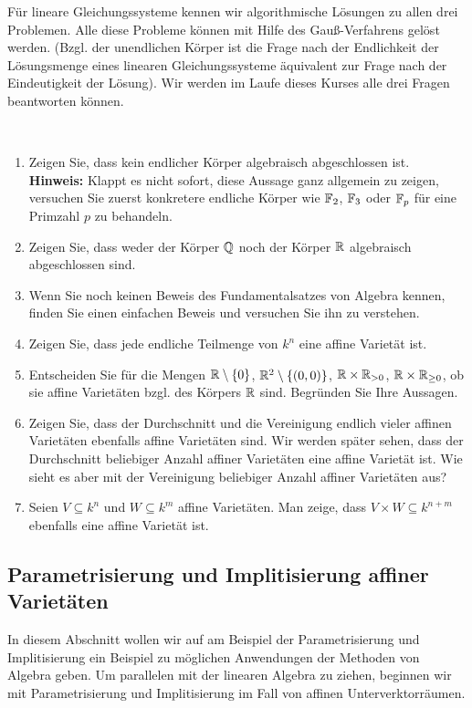\documentclass[11pt]{article}
\numberwithin{equation}{section}
\begin{document}
Für lineare Gleichungssysteme kennen wir algorithmische Lösungen zu allen drei Problemen. Alle diese Probleme können mit Hilfe des Gauß-Verfahrens gelöst werden. (Bzgl. der unendlichen Körper ist die Frage nach der Endlichkeit der Lösungsmenge eines linearen Gleichungssysteme äquivalent zur Frage nach der Eindeutigkeit der Lösung). Wir werden im Laufe dieses Kurses alle drei Fragen beantworten können. 

\begin{aufgaben}{\ }
\begin{enumerate}
	\item Zeigen Sie, dass kein endlicher Körper algebraisch abgeschlossen ist. \textbf{Hinweis:} Klappt es nicht sofort, diese Aussage ganz allgemein zu zeigen, versuchen Sie zuerst konkretere endliche Körper wie $\mathbb{F}_2$, $\mathbb{F}_3$ oder $\mathbb{F}_p$ für eine Primzahl $p$ zu behandeln. 
	\item Zeigen Sie, dass weder der Körper $\mathbb{Q}$ noch der Körper $\mathbb{R}$ algebraisch abgeschlossen sind. 
	\item Wenn Sie noch keinen Beweis des Fundamentalsatzes von Algebra kennen, finden Sie einen einfachen Beweis und versuchen Sie ihn zu verstehen. 
	\item Zeigen Sie, dass jede endliche Teilmenge von $k^n$ eine affine Varietät ist. 
	\item Entscheiden Sie für die Mengen $ \mathbb{R} \setminus \{0\} $, $\mathbb{R}^2 \setminus \{(0,0)\}$, $\mathbb{R} \times \mathbb{R}_{>0}$, $\mathbb{R} \times \mathbb{R}_{\ge 0}$, ob sie affine Varietäten bzgl. des Körpers $\mathbb{R}$ sind. Begründen Sie Ihre Aussagen. 
	\item Zeigen Sie, dass der Durchschnitt und die Vereinigung endlich vieler affinen Varietäten ebenfalls affine Varietäten sind. Wir werden später sehen, dass der Durchschnitt beliebiger Anzahl affiner Varietäten eine affine Varietät ist. Wie sieht es aber mit der Vereinigung beliebiger Anzahl affiner Varietäten aus? 
	\item Seien $V \subseteq k^n$ und $W \subseteq k^m$ affine Varietäten. Man zeige, dass $V \times W \subseteq k^{n +m}$ ebenfalls eine affine Varietät ist. 
\end{enumerate}
\end{aufgaben} 

\subsection{Parametrisierung und Implitisierung affiner Varietäten}

In diesem Abschnitt wollen wir auf am Beispiel der Parametrisierung und Implitisierung ein Beispiel zu möglichen Anwendungen der Methoden von Algebra geben. Um parallelen mit der linearen Algebra zu ziehen, beginnen wir mit Parametrisierung und Implitisierung im Fall von affinen Unterverktorräumen. 
\end{document}

